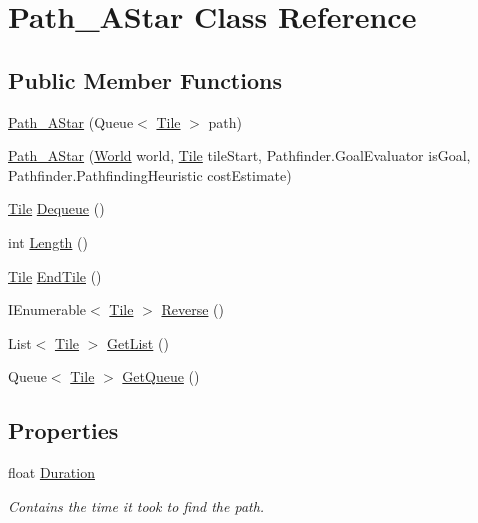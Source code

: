 \hypertarget{class_path___a_star}{}\section{Path\+\_\+\+A\+Star Class Reference}
\label{class_path___a_star}
\subsection*{Public Member Functions}
\begin{DoxyCompactItemize}
\item 
\hyperlink{class_path___a_star_a63a4d681a61d85b9c7a3914d0522f31c}{Path\+\_\+\+A\+Star} (Queue$<$ \hyperlink{class_tile}{Tile} $>$ path)
\item 
\hyperlink{class_path___a_star_ad165a839440045b38c1bf14868fc1e42}{Path\+\_\+\+A\+Star} (\hyperlink{class_world}{World} world, \hyperlink{class_tile}{Tile} tile\+Start, Pathfinder.\+Goal\+Evaluator is\+Goal, Pathfinder.\+Pathfinding\+Heuristic cost\+Estimate)
\item 
\hyperlink{class_tile}{Tile} \hyperlink{class_path___a_star_af284152da3bdc3e64635d132b0e73d38}{Dequeue} ()
\item 
int \hyperlink{class_path___a_star_ac1f61fdada2f5a23c3cc748c3f1f143a}{Length} ()
\item 
\hyperlink{class_tile}{Tile} \hyperlink{class_path___a_star_a13629f55ecca04b9d4993356edb825e7}{End\+Tile} ()
\item 
I\+Enumerable$<$ \hyperlink{class_tile}{Tile} $>$ \hyperlink{class_path___a_star_ae3c8bf37c3a3e5adc0dc1b37d7fb8dc0}{Reverse} ()
\item 
List$<$ \hyperlink{class_tile}{Tile} $>$ \hyperlink{class_path___a_star_a81fcf519a90b93c62276b80ccad130e5}{Get\+List} ()
\item 
Queue$<$ \hyperlink{class_tile}{Tile} $>$ \hyperlink{class_path___a_star_ab0a0df483c3ebd910b7d7dccc9b94419}{Get\+Queue} ()
\end{DoxyCompactItemize}
\subsection*{Properties}
\begin{DoxyCompactItemize}
\item 
float \hyperlink{class_path___a_star_ac9c17d07d47d2ef16c9dd50bf710e74a}{Duration}
\begin{DoxyCompactList}\small\item\em Contains the time it took to find the path. \end{DoxyCompactList}\end{DoxyCompactItemize}


